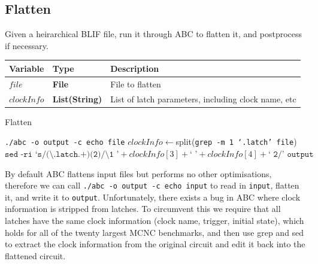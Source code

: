 \documentclass[12pt,final,oneside]{dwThesis} %
\begin{document}
   \subsection{Flatten}
   \label{algFlatten} Given a
   heirarchical \gls{BLIF} file, run it through
   \gls{ABC} to flatten it, and postprocess if
   necessary.  
   \begin{algorithm}

      \begin{center}


         \begin{tabularx}
            {\linewidth}{llX} \toprule Variable & Type &
            Description\\
            \midrule $file$ &\textbf{File } &  File to
            flatten\\
            $clockInfo$ & \textbf{List(String)} & List of latch parameters, including clock name, etc\\
            \bottomrule 
         \end{tabularx}

      \end{center}

      \caption{Flatten}\label{Flatten} 
      \begin{algorithmic}
         [1]
         \State \texttt{./abc -o output -c echo file}
         \State $clockInfo \gets $split(\texttt{grep -m 1 `.latch' file})
         \State $\texttt{sed -ri `s/(\textbackslash.latch.+)(2)/\textbackslash1 '} + clockInfo[3] + \texttt{` '} +
         clockInfo[4] + \texttt{` 2/' output} $\EndIf \EndProcedure 
      \end{algorithmic}


   \end{algorithm}

   By default \gls{ABC} flattens input files but performs no other optimisations, therefore we can call
   \texttt{./abc -o output -c echo input} to read in \texttt{input}, flatten it, and write it to \texttt{output}.
   Unfortunately, there exists a bug in \gls{ABC} where clock information is stripped from latches.
   To circumvent this we require that all latches have the same clock information (clock name, trigger, initial state),
   which holds for all of the twenty largest \gls{MCNC} benchmarks,
   and then use grep and sed to extract the clock information from the original circuit and edit it back into the flattened circuit.
\end{document}
